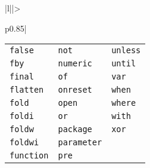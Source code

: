 \documentclass{template/openetcs_article}
\begin{document}
\begin{longtable}{|l||>{\raggedright}p{0.85\linewidth}|}
\begin{tabular}{l l l}
                            \texttt{false}     & \texttt{not}       & \texttt{unless}     \\
                            \texttt{fby}       & \texttt{numeric}   & \texttt{until}      \\
                            \texttt{final}     & \texttt{of}        & \texttt{var}        \\
                            \texttt{flatten}   & \texttt{onreset}   & \texttt{when}       \\
                            \texttt{fold}      & \texttt{open}      & \texttt{where}      \\
                            \texttt{foldi}     & \texttt{or}        & \texttt{with}       \\
                            \texttt{foldw}     & \texttt{package}   & \texttt{xor}        \\
                            \texttt{foldwi}    & \texttt{parameter}                       \\
                            \texttt{function}  & \texttt{pre}                             \\
                          \end{tabular}\tabularnewline \hline
\end{longtable}
\end{document}
